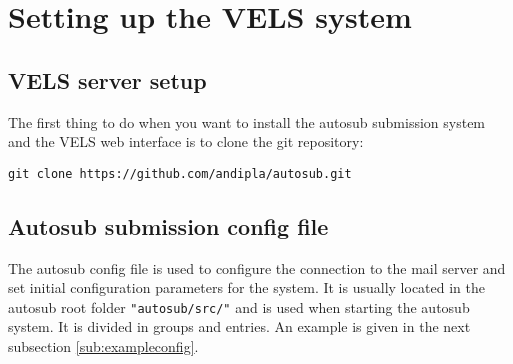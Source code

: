 \section{Setting up the VELS system} \label{setup}

\subsection{VELS server setup} \label{sub:serversetup}

The first thing to do when you want to install the autosub submission system and the VELS
web interface is to clone the git repository:

\begin{verbatim}
git clone https://github.com/andipla/autosub.git
\end{verbatim}

\subsection{Autosub submission config file}\label{sub:configfile}
The autosub config file is used to configure the connection to the mail server and set
initial configuration parameters for the system. It is usually located in the autosub root
folder {\tt "autosub/src/"} and is used when starting the autosub system. It is divided
in groups and entries. An example is given in the next subsection \ref{sub:exampleconfig}.

